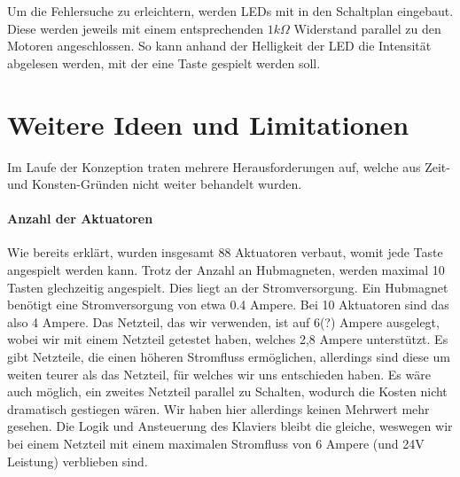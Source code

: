 Um die Fehlersuche zu erleichtern, werden LEDs mit in den Schaltplan eingebaut.
Diese werden jeweils mit einem entsprechenden $1k\Omega$ Widerstand parallel zu den Motoren angeschlossen.
So kann anhand der Helligkeit der LED die Intensität abgelesen werden, mit der eine Taste gespielt werden soll.



\section{Weitere Ideen und Limitationen}

Im Laufe der Konzeption traten mehrere Herausforderungen auf, welche aus Zeit- und Konsten-Gründen nicht weiter behandelt wurden.

\paragraph{Anzahl der Aktuatoren}
Wie bereits erklärt, wurden insgesamt 88 Aktuatoren verbaut, %
womit jede Taste angespielt werden kann. Trotz der Anzahl an
Hubmagneten, werden maximal 10 Tasten glechzeitig angespielt. Dies liegt an der Stromversorgung. Ein Hubmagnet benötigt
eine Stromversorgung von etwa 0.4 Ampere. Bei 10 Aktuatoren sind das also 4 Ampere. Das Netzteil, das wir verwenden, ist auf %
6(?) Ampere ausgelegt, wobei wir mit einem Netzteil getestet haben, welches 2,8 Ampere unterstützt.
Es gibt Netzteile, die einen höheren Stromfluss ermöglichen, allerdings sind diese um weiten teurer als das Netzteil, für welches wir uns entschieden haben.
Es wäre auch möglich, ein zweites Netzteil parallel zu Schalten, wodurch die Kosten nicht dramatisch gestiegen wären.
Wir haben hier allerdings keinen Mehrwert mehr gesehen. Die Logik und Ansteuerung des Klaviers bleibt die gleiche, weswegen
wir bei einem Netzteil mit einem maximalen Stromfluss von 6 Ampere (und 24V Leistung) verblieben sind.

